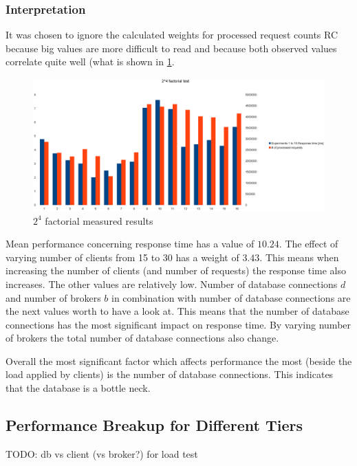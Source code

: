 \documentclass[milestone1.tex]{subfiles}
\begin{document}
\subsubsection{Interpretation}
It was chosen to ignore the calculated weights for processed request counts RC because big values are more difficult to read and because both observed values correlate quite well (what is shown in \ref{fig:2kmeasuredresults}.


\begin{figure}[H]
	\begin{center}
    \includegraphics[scale=0.3]{../drawings/2k-factorial-plot.eps}
  \end{center}
  \caption{$2^4$ factorial measured results}
  \label{fig:2kmeasuredresults}
\end{figure}



Mean performance concerning response time has a value of $10.24$. The effect of varying number of clients from 15 to 30 has a weight of $3.43$. This means when increasing the number of clients (and number of requests) the response time also increases. The other values are relatively low. Number of database connections $d$ and number of brokers $b$ in combination with number of database connections  are the next values worth to have a look at. This means that the number of database connections has the most significant impact on response time. By varying number of brokers the total number of database connections also change.

Overall the most significant factor which affects performance the most (beside the load applied by clients) is the number of database connections. This indicates that the database is a bottle neck.



\subsection{Performance Breakup for Different Tiers}

TODO: db vs client (vs broker?) for load test
\end{document}
